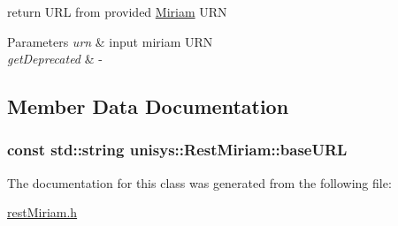 return U\-R\-L from provided \hyperlink{classunisys_1_1Miriam}{Miriam} U\-R\-N 


\begin{DoxyParams}{Parameters}
{\em urn} & input miriam U\-R\-N \\
\hline
{\em get\-Deprecated} & -\/ \\
\hline
\end{DoxyParams}


\subsection{Member Data Documentation}
\hypertarget{classunisys_1_1RestMiriam_ad90db24cf0fa12a18a36594df08d1a78}{
\subsubsection[{base\-U\-R\-L}]{\setlength{\rightskip}{0pt plus 5cm}const std\-::string unisys\-::\-Rest\-Miriam\-::base\-U\-R\-L\hspace{0.3cm}{\ttfamily [static]}}}\label{classunisys_1_1RestMiriam_ad90db24cf0fa12a18a36594df08d1a78}


The documentation for this class was generated from the following file\-:\begin{DoxyCompactItemize}
\item 
\hyperlink{restMiriam_8h}{rest\-Miriam.\-h}\end{DoxyCompactItemize}
